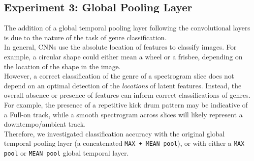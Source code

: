 \documentclass[12pt]{article}
\newcounter{ct}
\begin{document}
\subsection*{Experiment 3: Global Pooling Layer}
The addition of a global temporal pooling layer following 
the convolutional layers is due to the nature of the task of genre 
classification. \cite{c10}\\
In general, CNNs use the absolute location 
of features to classify images. For example, a circular shape could either mean 
a wheel or a frisbee, depending on the location of the shape in the 
image. \\However, a correct classification of the genre of a spectrogram slice  
does not depend on an optimal detection of the \textit{locations} 
of latent features. Instead, the overall absence or presence of features
can inform correct classifications of genres. 
For example, the presence of 
a repetitive kick drum pattern may be indicative of a Full-on track,
while a smooth spectrogram across slices will likely represent 
a downtempo/ambient track.\\
Therefore, we investigated classification accuracy with the original 
global temporal pooling layer (a concatenated {\tt MAX + MEAN pool}),
or with either a {\tt MAX pool} or {\tt MEAN pool} global temporal layer. 
\end{document}
